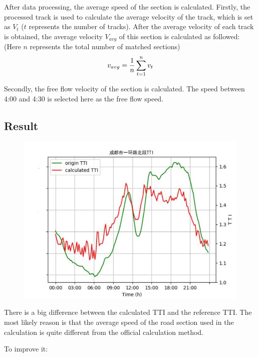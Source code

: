 \documentclass[fontset=none]{ctexart}
\theoremstyle{definition}
\theoremstyle{remark}
\begin{document}
After data processing, the average speed of the section is calculated.
Firstly, the processed track is used to calculate the average velocity of the track, which is set as $V_t$ ($t$ represents the number of tracks).
After the average velocity of each track is obtained, the average velocity $V_{avg}$ of this section is calculated as followed: (Here $n$ represents the total number of matched sections)
\begin{equation}
  v_{avg}=\frac 1n\sum_{t=1}^n v_t \notag
\end{equation}

Secondly, the free flow velocity of the section is calculated.
The speed between 4:00 and 4:30 is selected here as the free flow speed.

\subsection{Result}
\begin{figure}[htb]
  \centering
  \includegraphics[width=\textwidth]{images/tti3-4.jpg}
\end{figure}

There is a big difference between the calculated TTI and the reference TTI. The most likely reason is that the average speed of the road section used in the calculation is quite different from the official calculation method.

\clearpage
To improve it:
\end{document}
